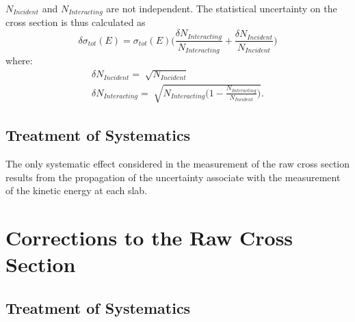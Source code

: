 $N_{Incident}$ and $N_{Interacting}$ are not independent.
The statistical uncertainty on the cross section is thus calculated as 
\begin{equation}
\delta\sigma_{tot}(E) = \sigma_{tot}(E) \Big(\frac{\delta N_{Interacting}}{N_{Interacting}}+\frac{\delta N_{Incident}}{N_{Incident}}\Big) 
\end{equation}
where:
\begin{eqnarray}
\delta N_{Incident} = \sqrt[]{N_{Incident}} \\
\delta N_{Interacting} = \sqrt[]{N_{Interacting}\Big(1-\frac{ N_{Interacting}}{N_{Incident}}\Big)}.
\end{eqnarray}



\subsection{Treatment of Systematics} \label{ch:SysUncertaintyXSRaw}
The only systematic effect considered in the measurement of the raw cross section results from the propagation of the uncertainty associate with the measurement of the kinetic energy at each slab.


\section{Corrections to the Raw Cross Section}\label{ch:PionXSCorrections}
\subsection{Treatment of Systematics}

